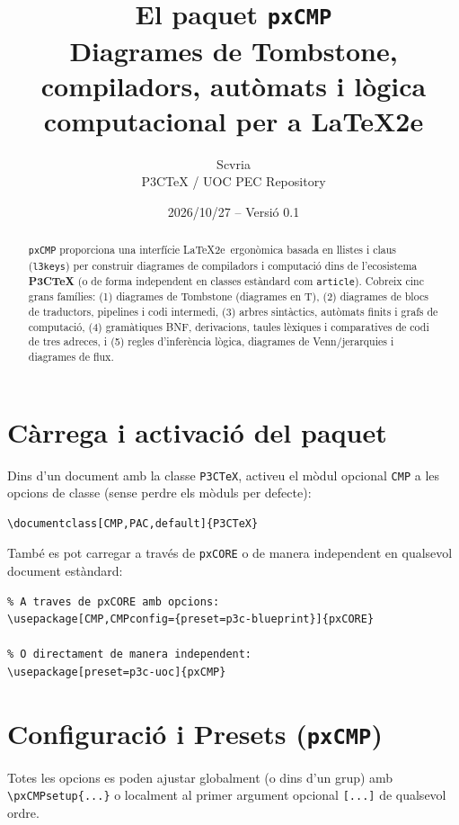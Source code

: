 \documentclass[11pt,a4paper]{article}
\title{El paquet \texttt{pxCMP}\\
  \large Diagrames de Tombstone, compiladors, aut\`omats i l\`ogica computacional per a \LaTeX2e}
\author{Scvria\\P3CTeX / UOC PEC Repository}
\date{2026/10/27 -- Versi\'o 0.1}
\begin{document}
\maketitle

\begin{abstract}
  \texttt{pxCMP} proporciona una interf\'icie \LaTeX2e\ ergon\`omica basada en llistes i claus
  (\texttt{l3keys}) per construir diagrames de compiladors i computaci\'o dins de l'ecosistema
  \textbf{P3CTeX} (o de forma independent en classes est\`andard com \texttt{article}).
  Cobreix cinc grans fam\'ilies: (1) diagrames de Tombstone (diagrames en T),
  (2) diagrames de blocs de traductors, pipelines i codi intermedi,
  (3) arbres sint\`actics, aut\`omats finits i grafs de computaci\'o,
  (4) gram\`atiques BNF, derivacions, taules l\`exiques i comparatives de codi de tres adreces,
  i (5) regles d'infer\`encia l\`ogica, diagrames de Venn/jerarquies i diagrames de flux.
\end{abstract}

\tableofcontents
\newpage

\section{C\`arrega i activaci\'o del paquet}

Dins d'un document amb la classe \texttt{P3CTeX}, activeu el m\`odul opcional \texttt{CMP}
a les opcions de classe (sense perdre els m\`oduls per defecte):

\begin{verbatim}
\documentclass[CMP,PAC,default]{P3CTeX}
\end{verbatim}

Tamb\'e es pot carregar a trav\'es de \texttt{pxCORE} o de manera independent en qualsevol
document est\`andard:

\begin{verbatim}
% A traves de pxCORE amb opcions:
\usepackage[CMP,CMPconfig={preset=p3c-blueprint}]{pxCORE}

% O directament de manera independent:
\usepackage[preset=p3c-uoc]{pxCMP}
\end{verbatim}

\section{Configuraci\'o i Presets (\texttt{pxCMP})}

 Totes les opcions es poden ajustar globalment (o dins d'un grup) amb \verb|\pxCMPsetup{...}|
o localment al primer argument opcional \verb|[...]| de qualsevol ordre.
\end{document}
